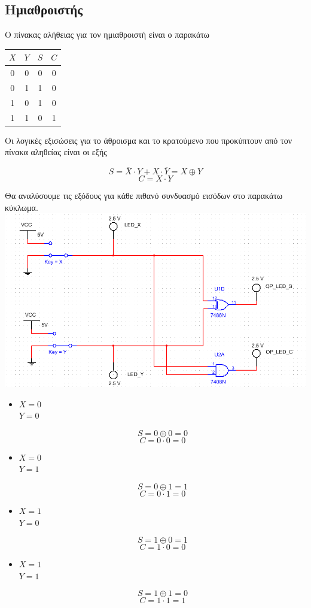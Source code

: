\documentclass{article}
\begin{document}
\subsection{Ημιαθροιστής}

Ο πίνακας αλήθειας για τον ημιαθροιστή είναι ο παρακάτω

\begin{center}
	\begin{tabular}{|c|c|c|c|}
	\hline
	$X$ & $Y$ & $S$ & $C$ \\
	\hline
	0 & 0 & 0 & 0 \\
	0 & 1 & 1 & 0 \\
	1 & 0 & 1 & 0 \\
	1 & 1 & 0 & 1 \\
	\hline
\end{tabular}
\end{center}

Οι λογικές εξισώσεις για το άθροισμα και το κρατούμενο που προκύπτουν από τον πίνακα
αληθείας είναι οι εξής

\[S = \overline{X} \cdot Y + X \cdot \overline{Y} = X \oplus Y\]
\[C = X \cdot Y\]

Θα αναλύσουμε τις εξόδους για κάθε πιθανό συνδυασμό εισόδων στο παρακάτω κύκλωμα. \\

\includegraphics[width=\textwidth]{./res/ha00.png}

\begin{itemize}
	\item
	$X = 0$ \\
	$Y = 0$

	\[S = 0 \oplus 0 = 0\]
	\[C = 0 \cdot 0 = 0\]

	\item
	$X = 0$ \\
	$Y = 1$

	\[S = 0 \oplus 1 = 1\]
	\[C = 0 \cdot 1 = 0\]

	\item
	$X = 1$ \\
	$Y = 0$

	\[S = 1 \oplus 0 = 1\]
	\[C = 1 \cdot 0 = 0\]

	\item
	$X = 1$ \\
	$Y = 1$

	\[S = 1 \oplus 1 = 0\]
	\[C = 1 \cdot 1 = 1\]
\end{itemize}
\end{document}
